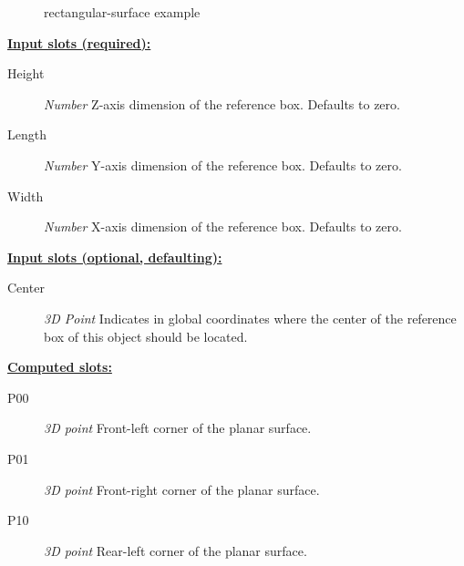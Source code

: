\documentclass [11pt]{book}
\begin{document}
\begin{itemize}
\begin{figure}
\caption{rectangular-surface example}

\label{fig:rectangular-surface}

\end{figure}





\textbf{
\underline{Input slots (required):}}

\begin{description}

\item [Height]
\emph{Number} Z-axis dimension of the reference box. Defaults to zero.


\item [Length]
\emph{Number} Y-axis dimension of the reference box. Defaults to zero.


\item [Width]
\emph{Number} X-axis dimension of the reference box. Defaults to zero.


\end{description}






\textbf{
\underline{Input slots (optional, defaulting):}}

\begin{description}

\item [Center]
\emph{3D Point} Indicates in global coordinates where the center of the reference
box of this object should be located.


\end{description}






\textbf{
\underline{Computed slots:}}

\begin{description}

\item [P00]
\emph{3D point} Front-left  corner of the planar surface.


\item [P01]
\emph{3D point} Front-right corner of the planar surface.


\item [P10]
\emph{3D point} Rear-left  corner of the planar surface.



\end{description}
\end{itemize}
\end{document}
